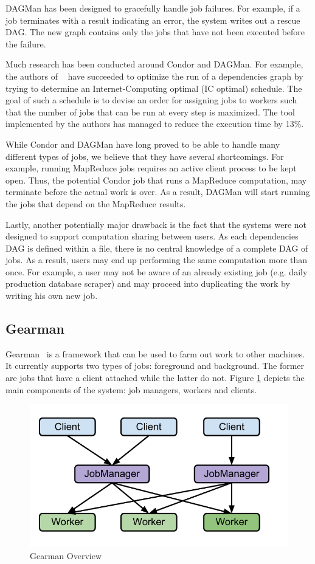 \documentclass[11pt,a4paper,twoside]{report}
\begin{document}
DAGMan has been designed to gracefully handle job failures. For example, if a job terminates with a result indicating an error, the system writes out a rescue DAG. The new graph contains only the jobs that have not been executed before the failure.


Much research has been conducted around Condor and DAGMan. For example, the authors of ~\cite{DAGMan} have succeeded to optimize the run of a dependencies graph by trying to determine an Internet-Computing optimal (IC optimal) schedule. The goal of such a schedule is to devise an order for assigning jobs to workers such that the number of jobs that can be run at every step is maximized. The tool implemented by the authors has managed to reduce the execution time by 13\%.


While Condor and DAGMan have long proved to be able to handle many different types of jobs, we believe that they have several shortcomings. For example, running MapReduce jobs requires an active client process to be kept open. Thus, the potential Condor job that runs a MapReduce computation, may terminate before the actual work is over. As a result, DAGMan will start running the jobs that depend on the MapReduce results.


Lastly, another potentially major drawback is the fact that the systems were not designed to support computation sharing between users. As each dependencies DAG is defined within a file, there is no central knowledge of a complete DAG of jobs. As a result, users may end up performing the same computation more than once. For example, a user may not be aware of an already existing job (e.g. daily production database scraper) and may proceed into duplicating the work by writing his own new job.

\subsection{Gearman}
Gearman~\cite{Gearman} is a framework that can be used to farm out work to other machines. It currently supports two types of jobs: foreground and background. The former are jobs that have a client attached while the latter do not. Figure \ref{fig:Gearman} depicts the main components of the system: job managers, workers and clients. 

\begin{figure}[h]
\centering
\includegraphics{Gearman}
\caption{Gearman Overview}
\label{fig:Gearman}
\end{figure}
\end{document}
